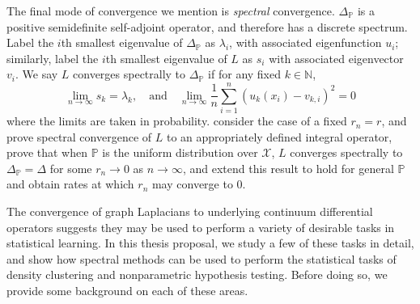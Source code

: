 \documentclass{article}
\newcommand{\Reals}{\mathbb{R}}
\newcommand{\1}{\mathbf{1}}
\newcommand{\Pbb}{\mathbb{P}}
\theoremstyle{alden}
\theoremstyle{aldenthm}
\theoremstyle{definition}
\theoremstyle{remark}
\begin{document}
The final mode of convergence we mention is \emph{spectral} convergence.  $\Delta_{\Pbb}$ is a positive semidefinite self-adjoint operator, and therefore has a discrete spectrum. Label the $i$th smallest eigenvalue of $\Delta_{\Pbb}$ as $\lambda_i$, with associated eigenfunction $u_i$; similarly, label the $i$th smallest eigenvalue of $L$ as $s_i$ with associated eigenvector $v_i$. We say $L$ converges spectrally to $\Delta_{\Pbb}$ if for any fixed $k \in \mathbb{N}$,
\begin{equation*}
\lim_{n \to \infty} s_{k} = \lambda_k, \quad \textrm{and} \quad \lim_{n \to \infty} \frac{1}{n}\sum_{i = 1}^{n} (u_k(x_i) - v_{k,i})^2 = 0
\end{equation*}
where the limits are taken in probability. \citet{vonluxburg2008} consider the case of a fixed $r_n = r$, and prove spectral convergence of $L$ to an appropriately defined integral operator, \citet{belkin07} prove that when $\Pbb$ is the uniform distribution over $\mathcal{X}$, $L$ converges spectrally to $\Delta_{\Pbb} = \Delta$ for some $r_n \to 0$ as $n \to \infty$, and \citet{garciatrillos18} extend this result to hold for general $\Pbb$ and obtain rates at which $r_n$ may converge to $0$. 

The convergence of graph Laplacians to underlying continuum differential operators suggests they may be used to perform a variety of desirable tasks in statistical learning. In this thesis proposal, we study a few of these tasks in detail, and show how spectral methods can be used to perform the statistical tasks of density clustering and nonparametric hypothesis testing. Before doing so, we provide some background on each of these areas.
	 
\end{document}
